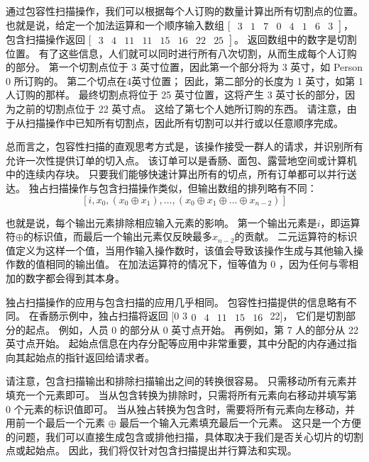 通过包容性扫描操作，我们可以根据每个人订购的数量计算出所有切割点的位置。 
也就是说，给定一个加法运算和一个顺序输入数组 [ $\left.\begin{array}{llllllll}
3 & 1 & 7 & 0 & 4 & 1 & 6 & 3
\end{array}\right]$， 包含扫描操作返回 [ $\left.\begin{array}{llllllllll}
3 & 4 & 11 & 11 & 15 & 16 & 22 & 25
\end{array}\right]$。 返回数组中的数字是切割位置。 
有了这些信息，人们就可以同时进行所有八次切割，从而生成每个人订购的部分。 
第一个切割点位于 3 英寸位置，因此第一个部分将为 3 英寸，如 Person 0 所订购的。 
第二个切点在4英寸位置； 因此，第二部分的长度为 1 英寸，如第 1 人订购的那样。 
最终切割点将位于 25 英寸位置，这将产生 3 英寸长的部分，因为之前的切割点位于 22 英寸点。 
这给了第七个人她所订购的东西。 请注意，由于从扫描操作中已知所有切割点，因此所有切割可以并行或以任意顺序完成。

总而言之，包容性扫描的直观思考方式是，该操作接受一群人的请求，并识别所有允许一次性提供订单的切入点。 
该订单可以是香肠、面包、露营地空间或计算机中的连续内存块。 
只要我们能够快速计算出所有的切点，所有订单都可以并行送达。 独占扫描操作与包含扫描操作类似，但输出数组的排列略有不同：
$$
\left[i, x_{0},\left(x_{0} \oplus x_{1}\right), \ldots,\left(x_{0} \oplus x_{1} \oplus \ldots \oplus x_ {n-2}\right)\right]
$$

也就是说，每个输出元素排除相应输入元素的影响。 
第一个输出元素是$i$，即运算符$\oplus$的标识值，而最后一个输出元素仅反映最多$x_{n-2}$的贡献。 
二元运算符的标识值定义为这样一个值，当用作输入操作数时，该值会导致该操作生成与其他输入操作数的值相同的输出值。 
在加法运算符的情况下，恒等值为 0 ，因为任何与零相加的数字都会得到其本身。

独占扫描操作的应用与包含扫描的应用几乎相同。 包容性扫描提供的信息略有不同。 
在香肠示例中，独占扫描将返回 [0 $3 \begin{array}{lllll}0 & 4 & 11 & 15 & 16\end{array}$ 22]，
它们是切割部分的起点。 例如，人员 0 的部分从 0 英寸点开始。 再例如，第 7 人的部分从 22 英寸点开始。 
起始点信息在内存分配等应用中非常重要，其中分配的内存通过指向其起始点的指针返回给请求者。

请注意，包含扫描输出和排除扫描输出之间的转换很容易。 只需移动所有元素并填充一个元素即可。 
当从包含转换为排除时，只需将所有元素向右移动并填写第 0 个元素的标识值即可。 
当从独占转换为包含时，需要将所有元素向左移动，并用前一个最后一个元素 $\oplus$ 最后一个输入元素填充最后一个元素。 
这只是一个方便的问题，我们可以直接生成包含或排他扫描，具体取决于我们是否关心切片的切割点或起始点。 
因此，我们将仅针对包含扫描提出并行算法和实现。

